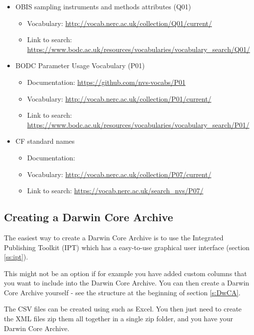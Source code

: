 \documentclass[a4paper,english, 11pt]{article}
\begin{document}
\begin{itemize}
\item OBIS sampling instruments and methods attributes (Q01) 
\begin{itemize}
\item Vocabulary: \url{http://vocab.nerc.ac.uk/collection/Q01/current/}
\item Link to search: \url{https://www.bodc.ac.uk/resources/vocabularies/vocabulary_search/Q01/}
\end{itemize}

\item BODC Parameter Usage Vocabulary (P01) 
\begin{itemize}
\item Documentation: \url{https://github.com/nvs-vocabs/P01}
\item Vocabulary: \url{http://vocab.nerc.ac.uk/collection/P01/current/}
\item Link to search: \url{https://www.bodc.ac.uk/resources/vocabularies/vocabulary_search/P01/}
\end{itemize}

\item CF standard names
\begin{itemize}
\item Documentation:
\item Vocabulary: \url{http://vocab.nerc.ac.uk/collection/P07/current/}
\item Link to search: \url{https://vocab.nerc.ac.uk/search_nvs/P07/}
\end{itemize}

\end{itemize}
\newpage

\subsection{Creating a Darwin Core Archive}

The easiest way to create a Darwin Core Archive is to use the Integrated Publishing Toolkit (IPT) which has a easy-to-use graphical user interface (section \ref{ss:ipt}). 

This might not be an option if for example you have added custom columns that you want to include into the Darwin Core Archive. You can then create a Darwin Core Archive yourself - see the structure at the beginning of section \ref{s:DwCA}.

The CSV files can be created using such as Excel. You then just need to create the XML files zip them all together in a single zip folder, and you have your Darwin Core Archive.
\end{document}
